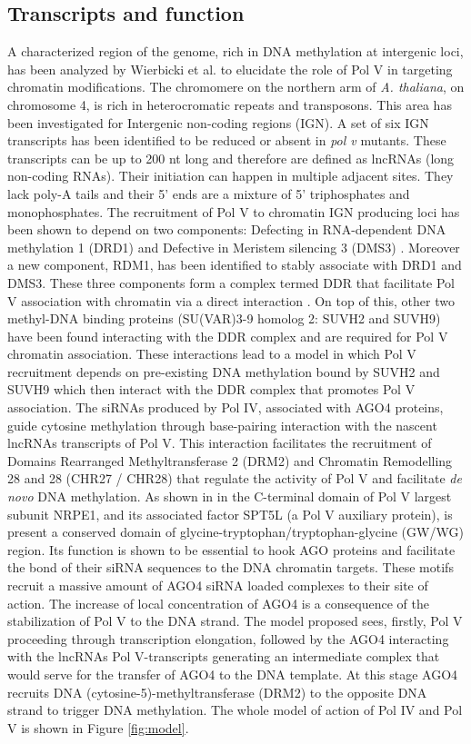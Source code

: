 \documentclass[a4paper, twocolumn]{article}
\begin{document}
\subsection{Transcripts and function}
A characterized region of the genome, rich in DNA methylation at intergenic loci, has been analyzed by Wierbicki et al. \cite{wierzbick1} to elucidate the role of Pol V in targeting chromatin modifications. 
The chromomere on the northern arm of \textit{A. thaliana}, on chromosome 4, is rich in heterocromatic repeats and transposons. This area has been investigated for Intergenic non-coding regions (IGN). A set of six IGN transcripts has been identified to be reduced or absent in \textit{pol v} mutants. These transcripts can be up to 200 nt long and therefore are defined as lncRNAs (long non-coding RNAs). Their initiation can happen in multiple adjacent sites. They lack poly-A tails and their 5' ends are a mixture of 5' triphosphates and monophosphates. 
The recruitment of Pol V to chromatin IGN producing loci has been shown to depend on two components: Defecting in RNA-dependent DNA methylation 1 (DRD1) and Defective in Meristem silencing 3 (DMS3) \cite{wierzbick1}. Moreover a new component, RDM1, has been identified to stably associate with DRD1 and DMS3. These three components form a complex termed DDR that facilitate Pol V association with chromatin via a direct interaction  \cite{LAW2010}. On top of this, other two methyl-DNA binding proteins (SU(VAR)3-9 homolog 2: SUVH2 and SUVH9) have been found interacting with the DDR complex \cite{Johnson2014} and are required for Pol V chromatin association. These interactions lead to a model in which Pol V recruitment depends on pre-existing DNA methylation bound by  SUVH2 and SUVH9 which then interact with the DDR complex that promotes Pol V association.
The siRNAs produced by Pol IV, associated with AGO4 proteins, guide cytosine methylation through base-pairing interaction with the nascent lncRNAs transcripts of Pol V. \cite{Wierzbicki2009} This interaction facilitates the recruitment of Domains Rearranged Methyltransferase 2 (DRM2) and Chromatin Remodelling 28 and 28 (CHR27 / CHR28) that regulate the activity of Pol V and facilitate \textit{de novo} DNA methylation.
As shown in \cite{LAHMY2016} in the C-terminal domain of Pol V largest subunit NRPE1, and its associated factor SPT5L (a Pol V auxiliary protein), is present a conserved domain of glycine-tryptophan/tryptophan-glycine (GW/WG) region. Its function is shown to be essential to hook AGO proteins and facilitate the bond of their siRNA sequences to the DNA chromatin targets. These motifs recruit a massive amount of AGO4 siRNA loaded complexes to their site of action. The increase of local concentration of AGO4 is a consequence of the stabilization of Pol V to the DNA strand. The model proposed sees, firstly, Pol V proceeding through transcription elongation, followed by the AGO4 interacting with the lncRNAs Pol V-transcripts generating an intermediate complex that would serve for the transfer of AGO4 to the DNA template. At this stage AGO4 recruits  DNA (cytosine-5)-methyltransferase (DRM2) to the opposite DNA strand to trigger DNA methylation.
The whole model of action of Pol IV and Pol V is shown in Figure \ref{fig:model}.
\end{document}
